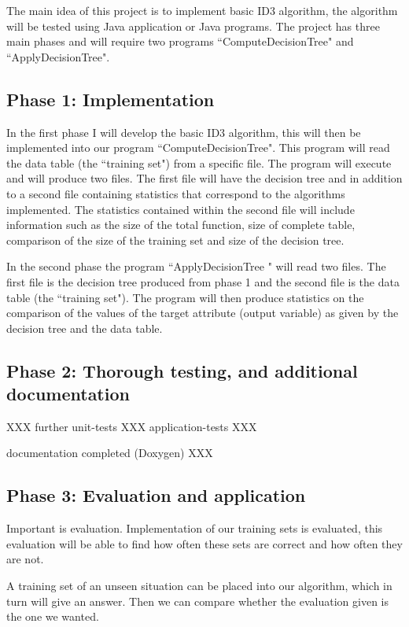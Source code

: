 \documentclass{report}
\begin{document}
The main idea of this project is to implement basic ID3 algorithm, the algorithm will be tested using Java application or Java programs. The project has three main phases and will require two programs ``ComputeDecisionTree" and ``ApplyDecisionTree". 


\subsection{Phase 1: Implementation}
\label{sec:phase1}

In the first phase I will develop the basic ID3 algorithm, this will then be implemented into our program ``ComputeDecisionTree". This program will read the data table (the ``training set") from a specific file. The program will execute and will produce two files. The first file will have the decision tree and in addition to a second file containing statistics that correspond to the algorithms implemented. The statistics contained within the second file will 
include information such as the size of the total function, size of complete table, comparison of the size of the training set and size of the decision tree.

In the second phase the program ``ApplyDecisionTree " will read two files. The first file is the decision tree produced from phase 1 and the second file is the data table (the ``training set"). The program will then produce statistics on the comparison of the values of the target attribute (output variable) as given by the decision tree and the data table.


\subsection{Phase 2: Thorough testing, and additional documentation}
\label{sec:phase2}

XXX further unit-tests XXX application-tests XXX

documentation completed (Doxygen) XXX


\subsection{Phase 3: Evaluation and application}
\label{sec:phase3}

Important is evaluation. Implementation of our training sets is evaluated, this evaluation will be able to find how often these sets are correct and how often they are not.

A training set of an unseen situation can be placed into our algorithm, which in turn will give an answer. Then we can compare whether the evaluation given is the one we wanted.
\end{document}
